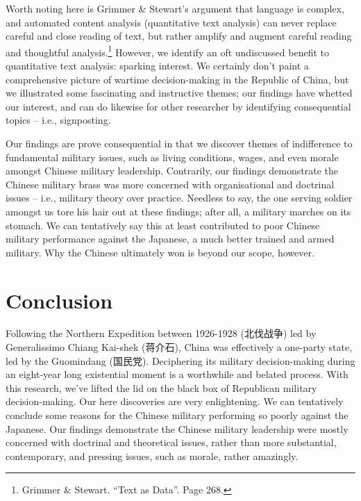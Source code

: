 \documentclass[12pt,letterpaper]{article}
\begin{document}
\begin{CJK*}{UTF8}{gbsn}
		\noindent Worth noting here is Grimmer $\&$ Stewart’s argument that language is complex, and automated content analysis (quantitative text analysis) can never replace careful and close reading of text, but rather amplify and augment careful reading and thoughtful analysis.\footnote{Grimmer $\&$ Stewart. “Text as Data”. Page 268.} However, we identify an oft undiscussed benefit to quantitative text analysis: sparking interest. We certainly don’t paint a comprehensive picture of wartime decision-making in the Republic of China, but we illustrated some fascinating and instructive themes; our findings have whetted our interest, and can do likewise for other researcher by identifying consequential topics – i.e., signposting.
		
		\vspace{.35cm}
		
		\noindent Our findings are prove consequential in that we discover themes of indifference to fundamental military issues, such as living conditions, wages, and even morale amongst Chinese military leadership. Contrarily, our findings demonstrate the Chinese military brass was more concerned with organisational and doctrinal issues – i.e., military theory over practice. Needless to say, the one serving soldier amongst us tore his hair out at these findings; after all, a military marches on its stomach. We can tentatively say this at least contributed to poor Chinese military performance against the Japanese, a much better trained and armed military. Why the Chinese ultimately won is beyond our scope, however. 
		
		\vspace{.5cm}
		\maketitle
		\section*{Conclusion}
		\vspace{.1cm}
		\noindent Following the Northern Expedition between 1926-1928 (北伐战争) led by Generalissimo Chiang Kai-shek (蒋介石), China was effectively a one-party state, led by the Guomindang (国民党). Deciphering its military decision-making during an eight-year long existential moment is a worthwhile and belated process. With this research, we’ve lifted the lid on the black box of Republican military decision-making. Our here discoveries are very enlightening. We can tentatively conclude some reasons for the Chinese military performing so poorly against the Japanese. Our findings demonstrate the Chinese military leadership were mostly concerned with doctrinal and theoretical issues, rather than more substantial, contemporary, and pressing issues, such as morale, rather amazingly. 
		

\end{CJK*}
\end{document}
